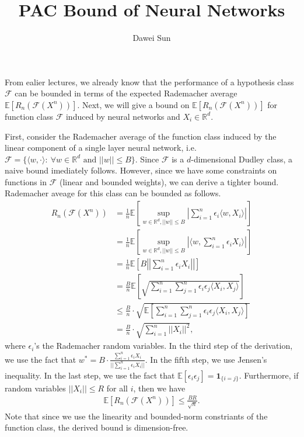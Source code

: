 \documentclass[12pt]{llncs}
\title{PAC Bound of Neural Networks}
\author{Dawei Sun}
\institute{\email{daweis2@illinois.edu}\\ University of Illinois at Urbana Champaign}
\newcommand{\E}[1]{\mathbb{E}\left[#1\right]}
\newcommand{\F}{\mathcal{F}}
\newcommand{\reals}{\mathbb{R}}
\begin{document}
\maketitle
From ealier lectures, we already know that the performance of a hypothesis class $\F$ can be bounded in terms of the expected Rademacher average $\E{R_n(\F(X^n))}$. Next, we will give a bound on $\E{R_n(\F(X^n))}$ for function class $\F$ induced by neural networks and $X_i \in \reals^d$.

First, consider the Rademacher average of the function class induced by the linear component of a single layer neural network, i.e. $\F = \{\langle w, \cdot \rangle :\ \forall w \in \reals^d\text{ and }||w|| \leq B\}$. Since $\F$ is a $d$-dimensional Dudley class, a naive bound imediately follows. However, since we have some constraints on functions in $\F$ (linear and bounded weights), we can derive a tighter bound. Rademacher aveage for this class can be bounded as follows.
\begin{align*}
  R_n(\F(X^n)) &= \frac{1}{n}\E{\sup\limits_{w \in \reals^d, ||w|| \leq B} \left| \sum_{i=1}^{n} \epsilon_i \langle w, X_i \rangle \right|}\\ &= \frac{1}{n}\E{\sup\limits_{w \in \reals^d, ||w|| \leq B} \left| \langle w, \sum_{i=1}^{n} \epsilon_i X_i \rangle \right|}\\ &= \frac{1}{n}\E{B \left|\left| \sum_{i=1}^{n} \epsilon_i X_i \right|\right|}\\ &= \frac{B}{n}\E{\sqrt{\sum_{i=1}^{n}\sum_{j=1}^{n} \epsilon_i \epsilon_j \langle X_i, X_j \rangle}}\\ &\leq \frac{B}{n} \cdot \sqrt{\E{\sum_{i=1}^{n}\sum_{j=1}^{n} \epsilon_i \epsilon_j \langle X_i, X_j \rangle}}\\ &= \frac{B}{n} \cdot \sqrt{\sum_{i=1}^{n} \left|\left| X_i \right|\right|^2},
\end{align*}
where $\epsilon_i$'s the Rademacher random variables. In the third step of the derivation, we use the fact that $w^* = B \cdot \frac{\sum_{i=1}^{n} \epsilon_i X_i}{||\sum_{i=1}^{n} \epsilon_i X_i||}$. In the fifth step, we use Jensen's inequality. In the last step, we use the fact that $\E{\epsilon_i \epsilon_j} = \bm 1_{\{i=j\}}$. Furthermore, if random variables $||X_i|| \leq R$ for all $i$, then we have
\begin{align}
  \E{R_n(\F(X^n))} \leq \frac{BR}{\sqrt{n}}.
\end{align}
Note that since we use the linearity and bounded-norm constriants of the function class, the derived bound is dimension-free.
\end{document}
